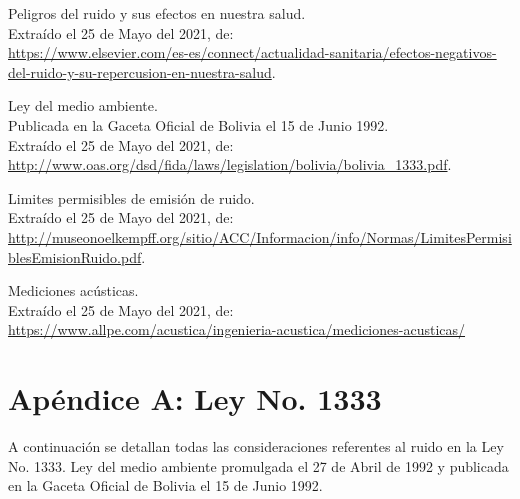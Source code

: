 \documentclass[letter,11pt]{article}
\begin{document}
\begin{thebibliography}{99}
 Peligros del ruido y sus efectos en nuestra salud.\\
Extraído el 25 de Mayo del 2021, de: \\
{\small \url{https://www.elsevier.com/es-es/connect/actualidad-sanitaria/efectos-negativos-del-ruido-y-su-repercusion-en-nuestra-salud}.}

 Ley del medio ambiente.\\
Publicada en la Gaceta Oficial de Bolivia el 15 de Junio 1992. \\
Extraído el 25 de Mayo del 2021, de: \\
{\small \url{http://www.oas.org/dsd/fida/laws/legislation/bolivia/bolivia_1333.pdf}.}

 Limites permisibles de emisión de ruido.\\
Extraído el 25 de Mayo del 2021, de: \\
{\small \url{http://museonoelkempff.org/sitio/ACC/Informacion/info/Normas/LimitesPermisiblesEmisionRuido.pdf}.}

 Mediciones acústicas.\\
Extraído el 25 de Mayo del 2021, de: \\
{\small \url{https://www.allpe.com/acustica/ingenieria-acustica/mediciones-acusticas/}}

\end{thebibliography}

\newpage
\section*{Apéndice A: Ley No. 1333}
A continuación se detallan todas las consideraciones referentes al ruido en la
Ley No. 1333. Ley del medio ambiente promulgada el 27 de Abril de 1992 y
publicada en la Gaceta Oficial de Bolivia el 15 de Junio 1992.
\end{document}
